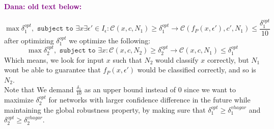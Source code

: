 \documentclass[11pt]{article}
\newcommand{\Dana}[1]{\textcolor{purple}{\bf Dana: #1}}
\begin{document}
   \Dana{old text below:}
   
$$\max{\delta_1^{opt}}, \texttt{ subject to } \exists{x}\exists{\epsilon'}\in{I_\epsilon}: \mathcal{C}(x,c,N_1) \geq \delta_1^{opt} \rightarrow \mathcal{C}(f_P(x,\epsilon'),c',N_1)\leq \frac{\delta_1^{opt}}{10} $$
after optimizing $\delta_1^{opt}$ we optimize the following:
$$\max{\delta_2^{opt}}, \texttt{ subject to }  \exists{x}:  \mathcal{C}(x,c,N_2) \geq \delta_2^{opt} \rightarrow \mathcal{C}(x,c,N_1)\leq \delta_1^{opt}$$
Which means, we look for input $x$ such that $N_2$ would classify $x$ correctly, but $N_1$ wont be able to guarantee that $f_P(x,\epsilon')$ would be classified correctly, and so is $N_2$. 
\\
Note that We demand $\frac{\delta_1}{10}$ as an upper bound instead of $0$ since we want to maximize $\delta_2^{opt}$ for networks with larger confidence difference in the future while maintaining the global robustness property, by making sure that $\delta_1^{opt} \geq \delta^{vhagar}_1$ and $\delta_2^{opt} \geq \delta^{vhagar}_2$.

\end{document}
